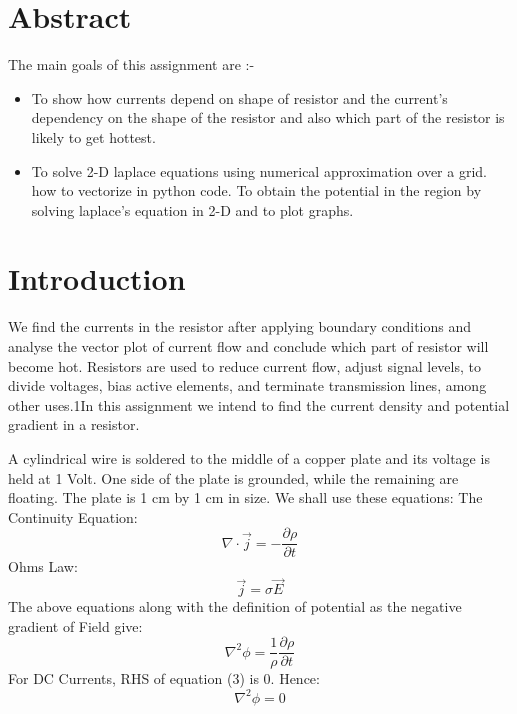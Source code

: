 \documentclass[11pt, a4paper]{article}
\title{\bold{\underline{\textit{\Large{Assignment 5: The Resistor Problem}}}}}
\author{ROHIT KUMAR [EE20B111]}
\date{March 11, 2021}
\begin{document}
	
		
\maketitle 
\section*{Abstract}
 The main goals of this assignment are :-
  \begin{itemize}
  \item
  	To show how currents depend on shape of resistor and the current's dependency on the shape of
the resistor and also which part of the resistor is likely to get hottest.
  \item
    To solve 2-D laplace equations using numerical approximation over a grid. how to vectorize in python code. To obtain the potential in the region by solving laplace's equation in 2-D and to plot graphs.
\end{itemize}  	
  
  \section{Introduction}
   We find the currents in the resistor after applying boundary conditions and analyse
the vector plot of current flow and conclude which part of resistor will
become hot. Resistors are used to reduce current flow, adjust signal levels, to divide voltages, bias active elements, and terminate transmission lines, among other uses.1In this assignment we intend to find the current density and potential gradient in a resistor.

	A  cylindrical wire is soldered to the middle of a copper plate and its voltage is held at 1 Volt.  One side of the plate is grounded, while the remaining are floating. The plate is 1 cm by 1 cm in size.\newline
We shall use these equations:\newline
The Continuity Equation:
\begin{equation}
    \nabla \cdot \vec{j} = - \frac{\partial\rho}{\partial t}
\end{equation}
Ohms Law:
\begin{equation}
    \vec{j} = \sigma\vec{E}
\end{equation}
The above equations along with the definition of potential as the negative gradient of Field give:
\begin{equation}
    \nabla^2 \phi =  \frac{1}{\rho}\frac{\partial\rho}{\partial t}
\end{equation}
For DC Currents, RHS of equation (3) is 0. Hence:
\begin{equation}
    \nabla^2 \phi =  0
\end{equation}
    
\end{document}
